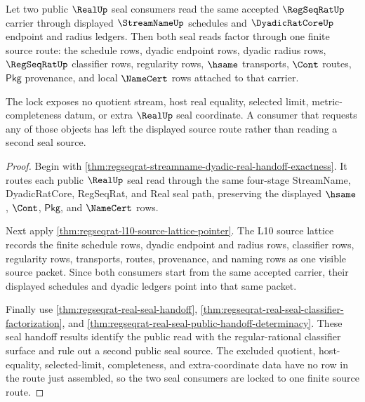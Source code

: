 \begin{theorem}
\label{thm:regseqrat-streamname-dyadic-real-handoff-single-source-lock}
Let two public $\RealUp$ seal consumers read the same accepted
$\RegSeqRatUp$ carrier through displayed $\StreamNameUp$ schedules and
$\DyadicRatCoreUp$ endpoint and radius ledgers. Then both seal reads factor
through one finite source route: the schedule rows, dyadic endpoint rows,
dyadic radius rows, $\RegSeqRatUp$ classifier rows, regularity rows,
$\hsame$ transports, $\Cont$ routes, $\mathsf{Pkg}$ provenance, and local
$\NameCert$ rows attached to that carrier.

The lock exposes no quotient stream, host real equality, selected limit,
metric-completeness datum, or extra $\RealUp$ seal coordinate. A consumer that
requests any of those objects has left the displayed source route rather than
reading a second seal source.
\end{theorem}
\begin{proof}
Begin with \autoref{thm:regseqrat-streamname-dyadic-real-handoff-exactness}.
It routes each public $\RealUp$ seal read through the same four-stage
StreamName, DyadicRatCore, RegSeqRat, and Real seal path, preserving the
displayed $\hsame$, $\Cont$, $\mathsf{Pkg}$, and $\NameCert$ rows.

Next apply \autoref{thm:regseqrat-l10-source-lattice-pointer}. The L10 source
lattice records the finite schedule rows, dyadic endpoint and radius rows,
classifier rows, regularity rows, transports, routes, provenance, and naming
rows as one visible source packet. Since both consumers start from the same
accepted carrier, their displayed schedules and dyadic ledgers point into that
same packet.

Finally use \autoref{thm:regseqrat-real-seal-handoff},
\autoref{thm:regseqrat-real-seal-classifier-factorization}, and
\autoref{thm:regseqrat-real-seal-public-handoff-determinacy}. These seal
handoff results identify the public read with the regular-rational classifier
surface and rule out a second public seal source. The excluded quotient,
host-equality, selected-limit, completeness, and extra-coordinate data have no
row in the route just assembled, so the two seal consumers are locked to one
finite source route.
\end{proof}

